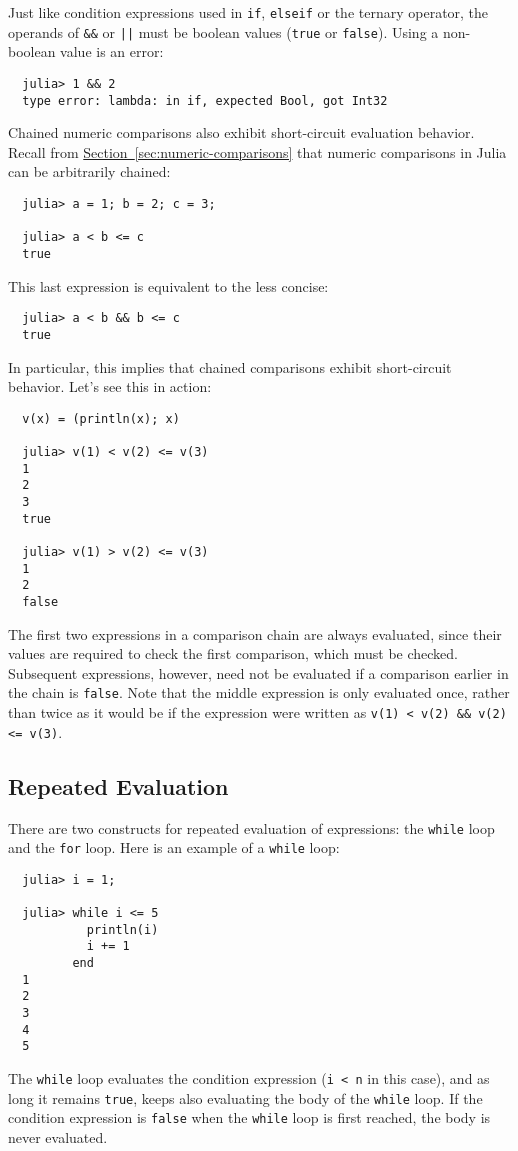 \documentclass{article}
\renewcommand{\sec}[1]{\label{sec:#1}}
\newcommand{\Section}[1]{\hyperref[sec:#1]{Section~\ref*{sec:#1}}}
\begin{document}
Just like condition expressions used in \verb|if|, \verb|elseif| or the ternary operator, the operands of \verb|&&| or \texttt{||} must be boolean values (\verb|true| or \verb|false|).
Using a non-boolean value is an error:
\begin{verbatim}
  julia> 1 && 2
  type error: lambda: in if, expected Bool, got Int32
\end{verbatim}

Chained numeric comparisons also exhibit short-circuit evaluation behavior.
Recall from \Section{numeric-comparisons} that numeric comparisons in Julia can be arbitrarily chained:
\begin{verbatim}
  julia> a = 1; b = 2; c = 3;

  julia> a < b <= c
  true
\end{verbatim}
This last expression is equivalent to the less concise:
\begin{verbatim}
  julia> a < b && b <= c
  true
\end{verbatim}
In particular, this implies that chained comparisons exhibit short-circuit behavior.
Let's see this in action:
\begin{verbatim}
  v(x) = (println(x); x)

  julia> v(1) < v(2) <= v(3)
  1
  2
  3
  true

  julia> v(1) > v(2) <= v(3)
  1
  2
  false
\end{verbatim}
The first two expressions in a comparison chain are always evaluated, since their values are required to check the first comparison, which must be checked.
Subsequent expressions, however, need not be evaluated if a comparison earlier in the chain is \verb|false|.
Note that the middle expression is only evaluated once, rather than twice as it would be if the expression were written as \verb|v(1) < v(2) && v(2) <= v(3)|.

\subsection{Repeated Evaluation}\sec{repeated-evaluation}

There are two constructs for repeated evaluation of expressions:
the \verb|while| loop and the \verb|for| loop.
Here is an example of a \verb|while| loop:
\begin{verbatim}
  julia> i = 1;

  julia> while i <= 5
           println(i)
           i += 1
         end
  1
  2
  3
  4
  5
\end{verbatim}
The \verb|while| loop evaluates the condition expression (\verb|i < n| in this case), and as long it remains \verb|true|, keeps also evaluating the body of the \verb|while| loop.
If the condition expression is \verb|false| when the \verb|while| loop is first reached, the body is never evaluated.
\end{document}
